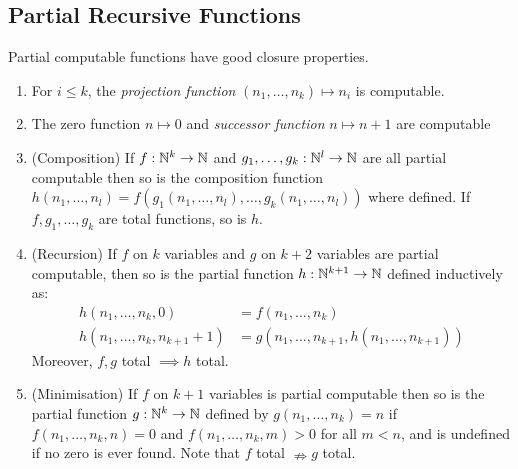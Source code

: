 \documentclass[10pt,a4paper]{article}
\begin{document}
\subsection*{Partial Recursive Functions}
Partial computable functions have good closure properties.
\begin{theorem}
\item
\begin{enumerate}
\item For $i\leq k$, the \emph{projection function} $(n_1, \ldots, n_k) \mapsto n_i$ is computable.
\item The zero function $n\mapsto 0$ and \emph{successor function} $n\mapsto n+1$ are computable
\item (Composition) If $f:\mathbb{N}^k\rightarrow \mathbb{N}$ and $g_1, \ldots, g_k:\mathbb{N}^{l} \rightarrow \mathbb{N}$ are all partial computable then so is the composition function $h(n_1,\ldots,n_l) = f(g_1(n_1,\ldots,n_l),\ldots,g_k(n_1,\ldots,n_l))$ where defined. If $f,g_1,\ldots,g_k$ are total functions, so is $h$.
\item (Recursion) If $f$ on $k$ variables and $g$ on $k+2$ variables are partial computable, then so is the partial function $h:\mathbb{N}^{k+1}\rightarrow \mathbb{N}$ defined inductively as:
\begin{align*}
h(n_1,\ldots,n_k,0)&=f(n_1,\ldots,n_k)\\
h(n_1,\ldots,n_k,n_{k+1}+1) &= g(n_1,\ldots,n_{k+1},h(n_1,\ldots,n_{k+1}))
\end{align*}
Moreover, $f,g$ total $\implies h$ total.
\item (Minimisation) If $f$ on $k+1$ variables is partial computable then so is the partial function $g:\mathbb{N}^k\rightarrow \mathbb{N}$ defined by $g(n_1,\ldots,n_k) = n$ if $f(n_1,\ldots,n_k,n) = 0$ and $f(n_1,\ldots,n_k,m) > 0$ for all $m<n$, and is undefined if no zero is ever found. Note that $f$ total $\nRightarrow g$ total.
\end{enumerate}
\end{theorem}
\end{document}
